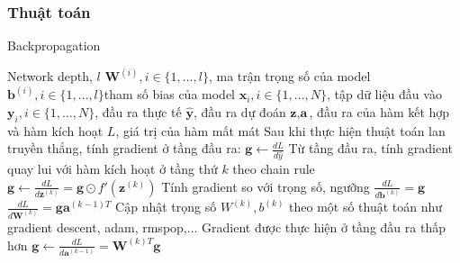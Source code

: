 \subsubsection{Thuật toán}

\begin{algorithm}[H]
\caption{Backpropagation }\label{al:forward}
\begin{algorithmic}
\REQUIRE Network depth, $l$
\REQUIRE $\textbf{W}^{(i)}, i \in \{1,\ldots,l\}$, ma trận trọng số của model
\REQUIRE $\textbf{b}^{(i)}, i\in \{1,\ldots,l\}$tham số bias của model
\REQUIRE $ \textbf{x}_i, i \in \{1,\ldots,N\} $, tập dữ liệu đầu vào
\REQUIRE $\textbf{y}_i,i \in \{1,\ldots,N\} $, đầu ra thực tế
\REQUIRE ${\widehat{\textbf{y}}}$, đầu ra dự đoán
\REQUIRE $\textbf{z},\textbf{a}$, đầu ra của hàm kết hợp và hàm kích hoạt
\REQUIRE $L$, giá trị của hàm mất mát
\STATE Sau khi thực hiện thuật toán lan truyền thẳng, tính gradient ở tầng đầu ra:
\STATE $\textbf{g} \gets \frac{d L}{d\widehat{y}} $
	\STATE Từ tầng đầu ra, tính gradient quay lui với hàm kích hoạt ở tầng thứ $k$ theo chain rule
	\STATE $\textbf{g} \gets \frac{d L}{d \textbf{z}^{(k)}} = \textbf{g} \odot f'(\textbf{z}^{(k)})$
	\STATE Tính gradient so với trọng số, ngưỡng
	\STATE $\frac{d L}{d \textbf{b}^{(k)}} = \textbf{g}$
	\STATE $\frac{d L}{d \textbf{W}^{(k)}} = \textbf{g}\textbf{a}^{(k-1)T}$
	\STATE Cập nhật trọng số $W^{(k)}, b^{(k)}$ theo một số thuật toán như gradient descent, adam, rmspop,...
	\STATE Gradient được thực hiện ở tầng đầu ra thấp hơn
	\STATE $\textbf{g} \gets \frac{d L}{d \textbf{a}^{(k-1)}} = \textbf{W}^{(k)T}\textbf{g} $
\ENDFOR
\end{algorithmic}
\end{algorithm}

